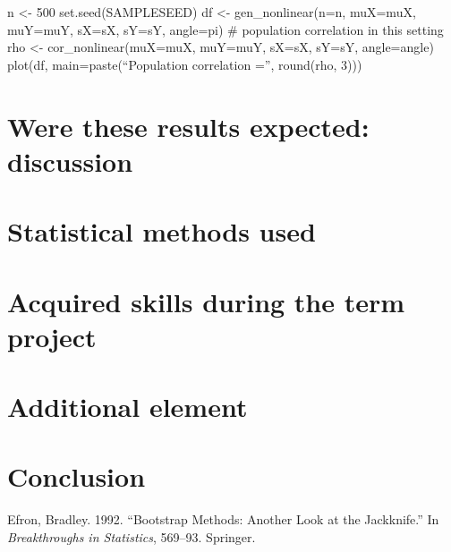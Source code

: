 \documentclass[11pt,]{article}
\begin{document}
n \textless{}- 500 set.seed(SAMPLESEED) df \textless{}-
gen\_nonlinear(n=n, muX=muX, muY=muY, sX=sX, sY=sY, angle=pi) \#
population correlation in this setting rho \textless{}-
cor\_nonlinear(muX=muX, muY=muY, sX=sX, sY=sY, angle=angle) plot(df,
main=paste(``Population correlation ='', round(rho, 3)))

\hypertarget{were-these-results-expected-discussion}{%
\section{Were these results expected:
discussion}\label{were-these-results-expected-discussion}}

\hypertarget{statistical-methods-used}{%
\section{Statistical methods used}\label{statistical-methods-used}}

\hypertarget{acquired-skills-during-the-term-project}{%
\section{Acquired skills during the term
project}\label{acquired-skills-during-the-term-project}}

\hypertarget{additional-element}{%
\section{Additional element}\label{additional-element}}

\hypertarget{conclusion}{%
\section*{Conclusion}\label{conclusion}}

\hypertarget{refs}{}
\leavevmode\hypertarget{ref-efron1992bootstrap}{}%
Efron, Bradley. 1992. ``Bootstrap Methods: Another Look at the
Jackknife.'' In \emph{Breakthroughs in Statistics}, 569--93. Springer.
\end{document}
